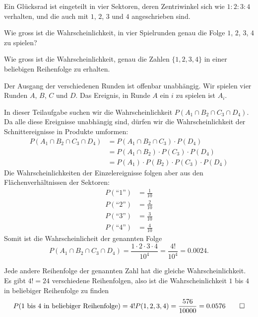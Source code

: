 Ein Glücksrad ist eingeteilt in vier Sektoren, deren Zentriwinkel
sich wie $1:2:3:4$ verhalten, und die auch mit $1$, $2$, $3$ und $4$
angeschrieben sind.
\begin{teilaufgaben}
\item Wie gross ist die Wahrscheinlichkeit, in vier Spielrunden genau die
Folge $1$, $2$, $3$, $4$ zu spielen?
\item Wie gross ist die Wahrscheinlichkeit, genau die Zahlen $\{1,2,3,4\}$
in einer beliebigen Reihenfolge zu erhalten.
\end{teilaufgaben}


\begin{loesung}
Der Ausgang der verschiedenen Runden ist offenbar unabhängig.
Wir spielen vier Runden $A$, $B$, $C$ und $D$. Das Ereignis, in
Runde $A$ ein $i$ zu spielen ist $A_i$.

\begin{teilaufgaben}
\item
In dieser Teilaufgabe suchen wir die Wahrscheinlichkeit
$P(A_1\cap B_2\cap C_3\cap D_4)$. Da alle diese Ereignisse
unabhängig sind, dürfen wir die Wahrscheinlichkeit der
Schnittereignisse in Produkte umformen:
\begin{align*}
P(A_1\cap B_2\cap C_3\cap D_4)
&=
P(A_1\cap B_2\cap C_3)\cdot P(D_4)
\\
&=
P(A_1\cap B_2)\cdot P(C_3)\cdot P(D_4)
\\
&=
P(A_1)\cdot P(B_2)\cdot P(C_3)\cdot P(D_4)
\end{align*}
Die Wahrscheinlichkeiten der Einzelereignisse folgen aber aus den
Flächenverhältnissen der Sektoren:
\begin{align*}
P(\text{``1''})&=\frac1{10}\\
P(\text{``2''})&=\frac2{10}\\
P(\text{``3''})&=\frac3{10}\\
P(\text{``4''})&=\frac4{10}
\end{align*}
Somit ist die Wahrscheinlicheit der genannten Folge
\[
P(A_1\cap B_2\cap C_3\cap D_4)
=\frac{1\cdot2\cdot 3\cdot 4}{10^4}=\frac{4!}{10^4}=0.0024.
\]
\item Jede andere Reihenfolge der genannten Zahl hat die gleiche
Wahrscheinlichkeit. Es gibt $4!=24$ verschiedene Reihenfolgen, also
ist die Wahrscheinlichkeit $1$ bis $4$ in beliebiger Reihenfolge
zu finden
\[
P(\text{$1$ bis $4$ in beliebiger Reihenfolge})=4!P(1,2,3,4)=
\frac{576}{10000}=0.0576
\qedhere
\]
\end{teilaufgaben}
\end{loesung}

